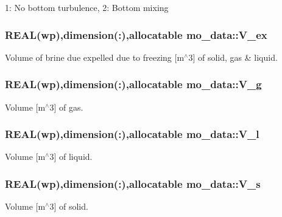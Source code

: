 1: No bottom turbulence, 2: Bottom mixing 

\hypertarget{namespacemo__data_abb13ad5e80b57e5d614b9888531a3201}{
\subsubsection[{V\_\-ex}]{\setlength{\rightskip}{0pt plus 5cm}REAL(wp),dimension(:),allocatable {\bf mo\_\-data::V\_\-ex}}}
\label{namespacemo__data_abb13ad5e80b57e5d614b9888531a3201}


Volume of brine due expelled due to freezing \mbox{[}m$^\wedge$3\mbox{]} of solid, gas \& liquid. 

\hypertarget{namespacemo__data_a274fbc519dd799929a177fdeaec56e91}{
\subsubsection[{V\_\-g}]{\setlength{\rightskip}{0pt plus 5cm}REAL(wp),dimension(:),allocatable {\bf mo\_\-data::V\_\-g}}}
\label{namespacemo__data_a274fbc519dd799929a177fdeaec56e91}


Volume \mbox{[}m$^\wedge$3\mbox{]} of gas. 

\hypertarget{namespacemo__data_ab24341b1a6dd799e63540fa8ed51d14c}{
\subsubsection[{V\_\-l}]{\setlength{\rightskip}{0pt plus 5cm}REAL(wp),dimension(:),allocatable {\bf mo\_\-data::V\_\-l}}}
\label{namespacemo__data_ab24341b1a6dd799e63540fa8ed51d14c}


Volume \mbox{[}m$^\wedge$3\mbox{]} of liquid. 

\hypertarget{namespacemo__data_a77750b1536deb5ddd2ebada202f1cf18}{
\subsubsection[{V\_\-s}]{\setlength{\rightskip}{0pt plus 5cm}REAL(wp),dimension(:),allocatable {\bf mo\_\-data::V\_\-s}}}
\label{namespacemo__data_a77750b1536deb5ddd2ebada202f1cf18}


Volume \mbox{[}m$^\wedge$3\mbox{]} of solid. 

